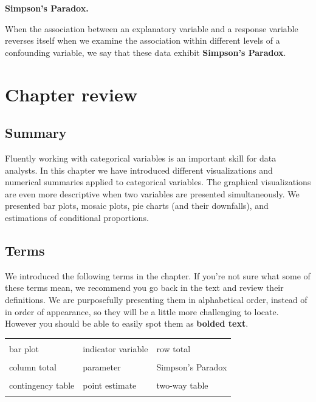 \documentclass[
  10pt,
  openany]{book}
\theoremstyle{definition}
\theoremstyle{definition}
\theoremstyle{definition}
\theoremstyle{definition}
\theoremstyle{remark}
\begin{document}
\textbf{Simpson's Paradox.}

When the association between an explanatory variable and a response variable reverses itself when we examine the association within different levels of a confounding variable, we say that these data exhibit \textbf{Simpson's Paradox}.

\section{Chapter review}\label{chp4-review}

\subsection*{Summary}\label{summary-2}

Fluently working with categorical variables is an important skill for data analysts.
In this chapter we have introduced different visualizations and numerical summaries applied to categorical variables.
The graphical visualizations are even more descriptive when two variables are presented simultaneously.
We presented bar plots, mosaic plots, pie charts (and their downfalls), and estimations of conditional proportions.

\subsection*{Terms}\label{terms-3}

We introduced the following terms in the chapter.
If you're not sure what some of these terms mean, we recommend you go back in the text and review their definitions.
We are purposefully presenting them in alphabetical order, instead of in order of appearance, so they will be a little more challenging to locate.
However you should be able to easily spot them as \textbf{bolded text}.

\begin{tabu} to 
\toprule
{} &  & \\
bar plot & indicator variable & row total\\
 &  & \\
column total & parameter & Simpson's Paradox\\
 &  & \\
contingency table & point estimate & two-way table\\
 &  & \\
\bottomrule
\end{tabu}
\end{document}
